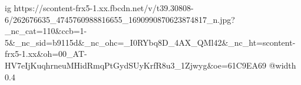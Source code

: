  
 
 
 
 

\ifcmt
  ig https://scontent-frx5-1.xx.fbcdn.net/v/t39.30808-6/262676635_4745760988816655_1690990870623874817_n.jpg?_nc_cat=110&ccb=1-5&_nc_sid=b9115d&_nc_ohc=_I0RYbq8D_4AX_QMl42&_nc_ht=scontent-frx5-1.xx&oh=00_AT-HV7eIjKuqhrneuMHidRmqPtGydSUyKrfR8u3_1Zjwyg&oe=61C9EA69
  @width 0.4
\fi

